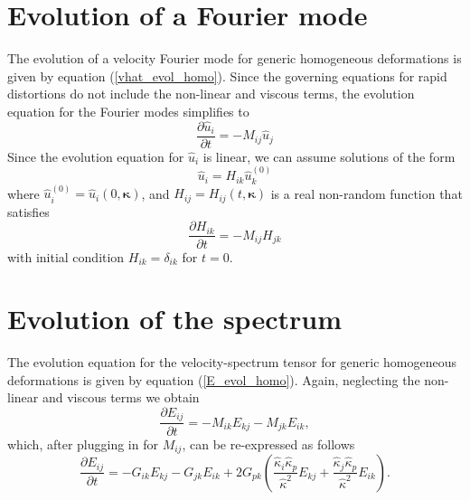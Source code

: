 \documentclass[oneside,a4paper,11pt]{report}
\newcommand{\est}{E}            %
\newcommand{\kappavec}{\boldsymbol{\kappa}}
\begin{document}
\section{Evolution of a Fourier mode}

The evolution of a velocity Fourier mode for generic homogeneous deformations is given by equation (\ref{vhat_evol_homo}). Since the governing equations for rapid distortions do not include the non-linear and viscous terms, the evolution equation for the Fourier modes simplifies to
\begin{equation}
\frac{\partial \hat{u}_i}{\partial t} = -M_{ij} \hat{u}_j 
\end{equation}
Since the evolution equation for $\hat{u}_i$ is linear, we can assume solutions of the form
\begin{equation}
\hat{u}_i = H_{ik} \hat{u}_k^{(0)}
\end{equation}
where $\hat{u}_i^{(0)} = \hat{u}_i(0,\kappavec)$, and $H_{ij} = H_{ij}(t,\kappavec)$ is a real non-random function that satisfies
\begin{equation}
\frac{\partial H_{ik}}{\partial t} = - M_{ij} H_{jk}
\end{equation}
with initial condition $H_{ik} = \delta_{ik}$ for $t=0$.

\section{Evolution of the spectrum}

The evolution equation for the velocity-spectrum tensor for generic homogeneous deformations is given by equation (\ref{E_evol_homo}). Again, neglecting the non-linear and viscous terms we obtain
\begin{equation}
\frac{\partial E_{ij}}{\partial t} = -M_{ik} E_{kj} - M_{jk} E_{ik},
\end{equation}
which, after plugging in for $M_{ij}$, can be re-expressed as follows
\begin{equation}
\label{evol_phi}
\frac{\partial \est_{ij}}{\partial t} = -G_{ik} \est_{kj} - G_{jk}\est_{ik} + 2 G_{pk} \left ( \frac{\hat{\kappa}_i \hat{\kappa}_p}{\hat{\kappa}^2} \est_{kj} + \frac{\hat{\kappa}_j \hat{\kappa}_p}{\hat{\kappa}^2} \est_{ik} \right ).
\end{equation}
\end{document}
